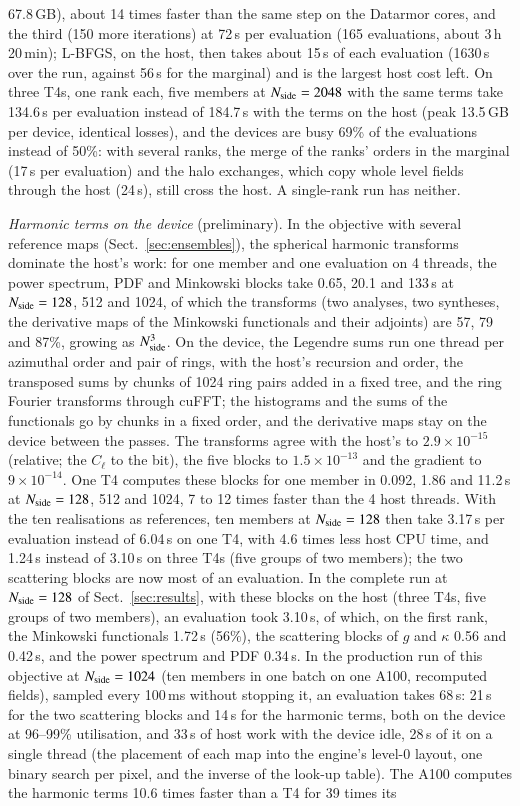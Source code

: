 \documentclass{aa}
\newcommand{\nside}{N_{\rm side}}
\begin{document}
67.8\,GB), about 14 times faster than the same step on the Datarmor cores, and the third (150 more iterations) at 72\,s per evaluation (165 evaluations, about 3\,h\,20\,min); L-BFGS, on the host, then takes about 15\,s of each evaluation (1630\,s over the run, against 56\,s for the marginal) and is the largest host cost left. On three T4s, one rank each, five members at $\nside=2048$ with the same terms take 134.6\,s per evaluation instead of 184.7\,s with the terms on the host (peak 13.5\,GB per device, identical losses), and the devices are busy 69\% of the evaluations instead of 50\%: with several ranks, the merge of the ranks' orders in the marginal (17\,s per evaluation) and the halo exchanges, which copy whole level fields through the host (24\,s), still cross the host. A single-rank run has neither.

\emph{Harmonic terms on the device} (preliminary). In the objective with several reference maps (Sect.~\ref{sec:ensembles}), the spherical harmonic transforms dominate the host's work: for one member and one evaluation on 4 threads, the power spectrum, PDF and Minkowski blocks take 0.65, 20.1 and 133\,s at $\nside=128$, 512 and 1024, of which the transforms (two analyses, two syntheses, the derivative maps of the Minkowski functionals and their adjoints) are 57, 79 and 87\%, growing as $\nside^3$. On the device, the Legendre sums run one thread per azimuthal order and pair of rings, with the host's recursion and order, the transposed sums by chunks of 1024 ring pairs added in a fixed tree, and the ring Fourier transforms through cuFFT; the histograms and the sums of the functionals go by chunks in a fixed order, and the derivative maps stay on the device between the passes. The transforms agree with the host's to $2.9\times10^{-15}$ (relative; the $C_\ell$ to the bit), the five blocks to $1.5\times10^{-13}$ and the gradient to $9\times10^{-14}$. One T4 computes these blocks for one member in 0.092, 1.86 and 11.2\,s at $\nside=128$, 512 and 1024, 7 to 12 times faster than the 4 host threads. With the ten \citet{takahashi2017} realisations as references, ten members at $\nside=128$ then take 3.17\,s per evaluation instead of 6.04\,s on one T4, with 4.6 times less host CPU time, and 1.24\,s instead of 3.10\,s on three T4s (five groups of two members); the two scattering blocks are now most of an evaluation. In the complete run at $\nside=128$ of Sect.~\ref{sec:results}, with these blocks on the host (three T4s, five groups of two members), an evaluation took 3.10\,s, of which, on the first rank, the Minkowski functionals 1.72\,s (56\%), the scattering blocks of $g$ and $\kappa$ 0.56 and 0.42\,s, and the power spectrum and PDF 0.34\,s. In the production run of this objective at $\nside=1024$ (ten members in one batch on one A100, recomputed fields), sampled every 100\,ms without stopping it, an evaluation takes 68\,s: 21\,s for the two scattering blocks and 14\,s for the harmonic terms, both on the device at 96--99\% utilisation, and 33\,s of host work with the device idle, 28\,s of it on a single thread (the placement of each map into the engine's level-0 layout, one binary search per pixel, and the inverse of the look-up table). The A100 computes the harmonic terms 10.6 times faster than a T4 for 39 times its 
\end{document}
